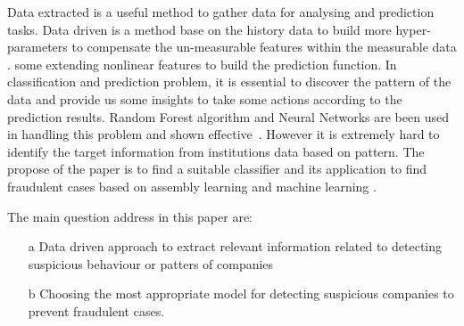 Data extracted is a useful method to gather data for analysing and prediction tasks. Data driven is a method base on the history data to build more hyper-parameters to compensate the un-measurable features within the measurable data \cite{SMARRA20181252}. some extending nonlinear features to build the prediction function. In classification and prediction problem, it is essential to discover the pattern of the data and provide us some insights to take some actions according to the prediction results. Random Forest algorithm and Neural Networks are been used in handling this problem and shown effective~\cite{10.1145/3414274.3414278, RB2021}. However it is extremely hard to identify the target information from institutions data based on pattern. The propose of the paper is to find a suitable classifier and its application to find fraudulent cases based on assembly learning and machine learning .











The main question address in this paper are:
\begin{itemize}
    \item[a] Data driven approach to extract relevant information related to detecting suspicious behaviour or patters of companies
    \item[b] Choosing the most appropriate model for detecting suspicious companies to prevent fraudulent cases.
\end{itemize}






